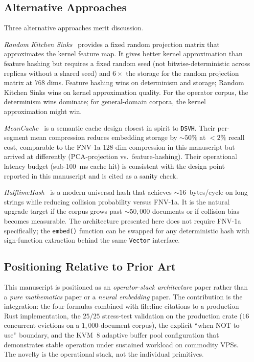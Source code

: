 \documentclass[10pt,twocolumn]{article}
\theoremstyle{definition}
\theoremstyle{remark}
\begin{document}
\subsection{Alternative Approaches}

Three alternative approaches merit discussion.

\emph{Random Kitchen Sinks}~\citep{rahimi2007random} provides a fixed
random projection matrix that approximates the kernel feature map. It
gives better kernel approximation than feature hashing but requires a
fixed random seed (not bitwise-deterministic across replicas without a
shared seed) and $6\times$ the storage for the random projection matrix
at $768$ dims. Feature hashing wins on determinism and storage; Random
Kitchen Sinks wins on kernel approximation quality. For the operator
corpus, the determinism wins dominate; for general-domain corpora, the
kernel approximation might win.

\emph{MeanCache}~\citep{meancache2024} is a semantic cache design closest
in spirit to \texttt{DSVH}. Their per-segment mean
compression reduces embedding storage by $\sim 50\%$ at $< 2\%$ recall
cost, comparable to the FNV-1a $128$-dim compression in this manuscript
but arrived at differently (PCA-projection vs.\ feature-hashing). Their
operational latency budget (sub-100~ms cache hit) is consistent
with the design point reported in this manuscript and is cited as a
sanity check.

\emph{HalftimeHash}~\citep{halftime2021} is a modern universal hash that
achieves $\sim 16$~bytes/cycle on long strings while reducing collision
probability versus FNV-1a. It is the natural upgrade target if the
corpus grows past $\sim 50{,}000$ documents or if collision bias becomes
measurable. The architecture presented here does not require FNV-1a
specifically; the \texttt{embed()} function can be swapped for any
deterministic hash with sign-function extraction behind the same
\texttt{Vector} interface.

\subsection{Positioning Relative to Prior Art}

This manuscript is positioned as an \emph{operator-stack architecture}
paper rather than a \emph{pure mathematics} paper or a \emph{neural
embedding} paper. The contribution is the integration: the four formulas
combined with file:line citations to a production Rust implementation,
the $25/25$ stress-test validation on the production crate
($16$ concurrent evictions on a $1{,}000$-document corpus), the explicit
``when NOT to use'' boundary, and the KVM~8 adaptive buffer pool
configuration that demonstrates stable operation under sustained
workload on commodity VPSs. The novelty is the operational stack,
not the individual primitives.
\end{document}
